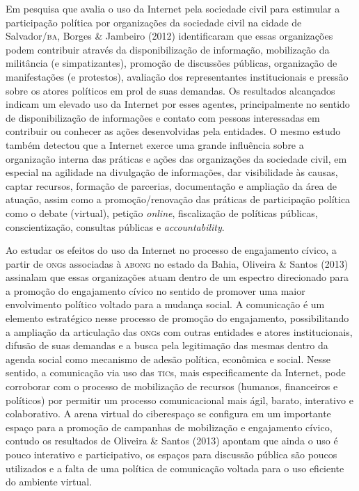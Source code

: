Em pesquisa que avalia o uso da Internet pela sociedade civil para
estimular a participação política por organizações da sociedade civil na
cidade de Salvador/\textsc{ba}, Borges \& Jambeiro (2012) identificaram que essas
organizações podem contribuir através da disponibilização de informação,
mobilização da militância (e simpatizantes), promoção de discussões
públicas, organização de manifestações (e protestos), avaliação dos
representantes institucionais e pressão sobre os atores políticos em
prol de suas demandas. Os resultados alcançados indicam um elevado uso
da Internet por esses agentes, principalmente no sentido de
disponibilização de informações e contato com pessoas interessadas em
contribuir ou conhecer as ações desenvolvidas pela entidades. O mesmo
estudo também detectou que a Internet exerce uma grande influência sobre
a organização interna das práticas e ações das organizações da sociedade
civil, em especial na agilidade na divulgação de informações, dar
visibilidade às causas, captar recursos, formação de parcerias,
documentação e ampliação da área de atuação, assim como a
promoção/renovação das práticas de participação política como o debate
(virtual), petição \emph{online}, fiscalização de políticas públicas,
conscientização, consultas públicas e \emph{accountability}.

Ao estudar os efeitos do uso da Internet no processo de engajamento
cívico, a partir de \textsc{ong}s associadas à \textsc{abong} no estado da Bahia, Oliveira
\& Santos (2013) assinalam que essas organizações atuam dentro de um
espectro direcionado para a promoção do engajamento cívico no sentido de
promover uma maior envolvimento político voltado para a mudança social.
A comunicação é um elemento estratégico nesse processo de promoção do
engajamento, possibilitando a ampliação da articulação das \textsc{ong}s com
outras entidades e atores institucionais, difusão de suas demandas e a
busca pela legitimação das mesmas dentro da agenda social como mecanismo
de adesão política, econômica e social. Nesse sentido, a comunicação via
uso das \textsc{tic}s, mais especificamente da Internet, pode corroborar com o
processo de mobilização de recursos (humanos, financeiros e políticos)
por permitir um processo comunicacional mais ágil, barato, interativo e
colaborativo. A arena virtual do ciberespaço se configura em um
importante espaço para a promoção de campanhas de mobilização e
engajamento cívico, contudo os resultados de Oliveira \& Santos (2013)
apontam que ainda o uso é pouco interativo e participativo, os espaços
para discussão pública são poucos utilizados e a falta de uma política
de comunicação voltada para o uso eficiente do ambiente virtual.


